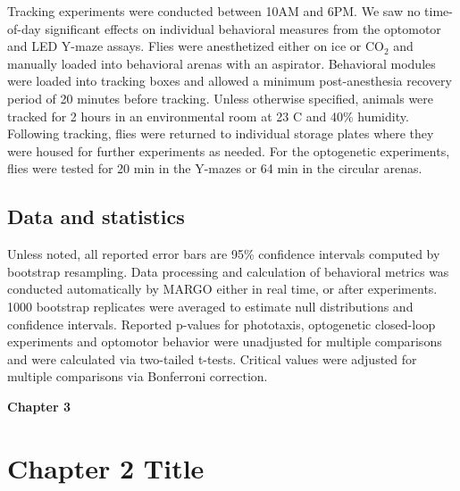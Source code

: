 \documentclass[12pt,letterpaper]{article}
\begin{document}
Tracking experiments were conducted between 10AM and 6PM. We saw no time-of-day significant effects on individual behavioral measures from the optomotor and LED Y-maze assays. Flies were anesthetized either on ice or CO$_{2}$ and manually loaded into behavioral arenas with an aspirator. Behavioral modules were loaded into tracking boxes and allowed a minimum post-anesthesia recovery period of 20 minutes before tracking. Unless otherwise specified, animals were tracked for 2 hours in an environmental room at 23 C and 40\% humidity. Following tracking, flies were returned to individual storage plates where they were housed for further experiments as needed. For the optogenetic experiments, flies were tested for 20 min in the Y-mazes or 64 min in the circular arenas.

\subsection*{Data and statistics}

Unless noted, all reported error bars are 95\% confidence intervals computed by bootstrap resampling. Data processing and calculation of behavioral metrics was conducted automatically by MARGO either in real time, or after experiments. 1000 bootstrap replicates were averaged to estimate null distributions and confidence intervals. Reported p-values for phototaxis, optogenetic closed-loop experiments and optomotor behavior were unadjusted for multiple comparisons and were calculated via two-tailed t-tests. Critical values were adjusted for multiple comparisons via Bonferroni correction.

\clearpage
\begin{center}
    \Large\textbf{Chapter 3}
    \thispagestyle{empty}       %
    \clearpage
\end{center}

\section*{Chapter 2 Title}
\end{document}
